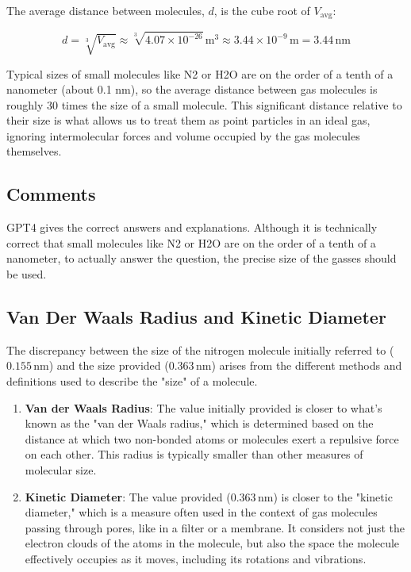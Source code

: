 \documentclass[12pt]{article}
\begin{document}
The average distance between molecules, \(d\), is the cube root of \(V_{\text{avg}}\):

\[
d = \sqrt[3]{V_{\text{avg}}} \approx \sqrt[3]{4.07 \times 10^{-26}} \, \text{m}^3 \approx 3.44 \times 10^{-9} \, \text{m} = 3.44 \, \text{nm}
\]

Typical sizes of small molecules like N2 or H2O are on the order of a tenth of a nanometer (about 0.1 nm), so the average distance between gas molecules is roughly 30 times the size of a small molecule. This significant distance relative to their size is what allows us to treat them as point particles in an ideal gas, ignoring intermolecular forces and volume occupied by the gas molecules themselves.

\subsection*{Comments}

GPT4 gives the correct answers and explanations. Although it is technically correct that small molecules like N2 or H2O are on the order of a tenth of a nanometer, to actually answer the question, the precise size of the gasses should be used. 

\subsection*{Van Der Waals Radius and Kinetic Diameter}

The discrepancy between the size of the nitrogen molecule initially referred to (\(0.155 \, \text{nm}\)) and the size provided (\(0.363 \, \text{nm}\)) arises from the different methods and definitions used to describe the "size" of a molecule.

\begin{enumerate}
    \item \textbf{Van der Waals Radius}: The value initially provided is closer to what's known as the "van der Waals radius," which is determined based on the distance at which two non-bonded atoms or molecules exert a repulsive force on each other. This radius is typically smaller than other measures of molecular size.
    
    \item \textbf{Kinetic Diameter}: The value provided (\(0.363 \, \text{nm}\)) is closer to the "kinetic diameter," which is a measure often used in the context of gas molecules passing through pores, like in a filter or a membrane. It considers not just the electron clouds of the atoms in the molecule, but also the space the molecule effectively occupies as it moves, including its rotations and vibrations.
\end{enumerate}
\end{document}
